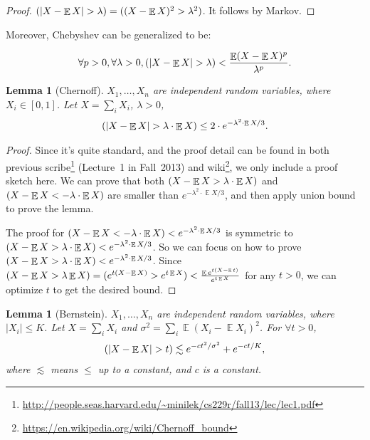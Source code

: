 \documentclass[11pt]{article}
\DeclareMathOperator*{\E}{\mathbb{E}}
\let\Pr\relax
\DeclareMathOperator*{\Pr}{\mathbb{P}}
\newtheorem{lemma}[theorem]{Lemma}
\begin{document}
\begin{proof}
$\Pr(|X-\E X|>\lambda)=\Pr((X-\E X)^2>\lambda^2)$. It follows by Markov.
\end{proof}

Moreover, Chebyshev can be generalized to be:

\begin{align}
\forall p>0, \forall \lambda>0, \Pr(|X-\E X| > \lambda)<\frac{\E(X-\E X)^p}{\lambda^p}.
\end{align}


\begin{lemma}[Chernoff]
$X_1,\ldots, X_n$ are independent random variables, where $X_i\in [0,1]$. Let $X=\sum_{i}{X_i}$, $\lambda>0$,
\begin{align}
\Pr(|X-\E X|>\lambda\cdot \E X)\le 2\cdot e^{-\lambda^2\cdot \E X/3}.
\end{align}
\end{lemma}

\begin{proof}
Since it's quite standard, and the proof detail can be found in both previous scribe\footnote{\url{http://people.seas.harvard.edu/~minilek/cs229r/fall13/lec/lec1.pdf}} (Lecture~1 in Fall~2013) and wiki\footnote{\url{https://en.wikipedia.org/wiki/Chernoff_bound}}, we only include a proof sketch here. We can prove that both $\Pr(X-\E X>\lambda\cdot \E X)$ and $\Pr(X-\E X<-\lambda\cdot \E X)$ are smaller than $e^{-\lambda^2\cdot \E X/3}$, and then apply union bound to prove the lemma. 

The proof for $\Pr(X-\E X<-\lambda\cdot \E X)<e^{-\lambda^2\cdot \E X/3}$ is symmetric to $\Pr(X-\E X>\lambda\cdot \E X)<e^{-\lambda^2\cdot \E X/3}$. So we can focus on how to prove $\Pr(X-\E X>\lambda\cdot \E X)<e^{-\lambda^2\cdot \E X/3}$. Since  $\Pr(X-\E X>\lambda \E X)=\Pr(e^{t(X-\E X)}>e^{t\E X})<\frac{\E e^{t(X-\E t)}}{e^{t\E X}}$ for any $t>0$, we can optimize $t$ to get the desired bound.
\end{proof}

\begin{lemma}[Bernstein] 
$X_1,\ldots,X_n$ are independent random variables, where $|X_i|\le K$. Let $X=\sum_{i}{X_i}$ and $\sigma^2=\sum_i{\E (X_i-\E X_i)^2}$. For $\forall t>0$,
\begin{align}
\Pr (|X-\E X|>t)\lesssim e^{-ct^2/\sigma^2}+e^{-ct/K}, 
\end{align}
where $\lesssim$ means $\le$ up to a constant, and $c$ is a constant.
\end{lemma}
\end{document}
